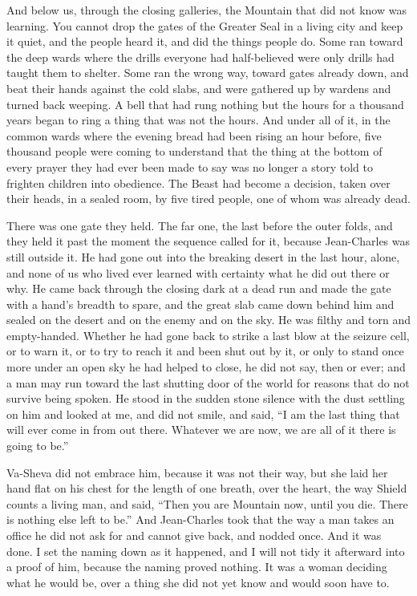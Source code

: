 And below us, through the closing galleries, the Mountain that did not know was learning. You cannot drop the gates of the Greater Seal in a living city and keep it quiet, and the people heard it, and did the things people do. Some ran toward the deep wards where the drills everyone had half-believed were only drills had taught them to shelter. Some ran the wrong way, toward gates already down, and beat their hands against the cold slabs, and were gathered up by wardens and turned back weeping. A bell that had rung nothing but the hours for a thousand years began to ring a thing that was not the hours. And under all of it, in the common wards where the evening bread had been rising an hour before, five thousand people were coming to understand that the thing at the bottom of every prayer they had ever been made to say was no longer a story told to frighten children into obedience. The Beast had become a decision, taken over their heads, in a sealed room, by five tired people, one of whom was already dead.\par

There was one gate they held. The far one, the last before the outer folds, and they held it past the moment the sequence called for it, because Jean-Charles was still outside it. He had gone out into the breaking desert in the last hour, alone, and none of us who lived ever learned with certainty what he did out there or why. He came back through the closing dark at a dead run and made the gate with a hand's breadth to spare, and the great slab came down behind him and sealed on the desert and on the enemy and on the sky. He was filthy and torn and empty-handed. Whether he had gone back to strike a last blow at the seizure cell, or to warn it, or to try to reach it and been shut out by it, or only to stand once more under an open sky he had helped to close, he did not say, then or ever; and a man may run toward the last shutting door of the world for reasons that do not survive being spoken. He stood in the sudden stone silence with the dust settling on him and looked at me, and did not smile, and said, ``I am the last thing that will ever come in from out there. Whatever we are now, we are all of it there is going to be.''\par

Va-Sheva did not embrace him, because it was not their way, but she laid her hand flat on his chest for the length of one breath, over the heart, the way Shield counts a living man, and said, ``Then you are Mountain now, until you die. There is nothing else left to be.'' And Jean-Charles took that the way a man takes an office he did not ask for and cannot give back, and nodded once. And it was done. I set the naming down as it happened, and I will not tidy it afterward into a proof of him, because the naming proved nothing. It was a woman deciding what he would be, over a thing she did not yet know and would soon have to.\par

